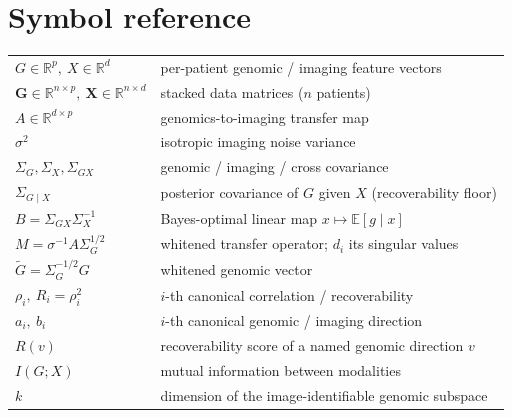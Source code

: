 \documentclass{article}
\newcommand{\R}{\mathbb{R}}
\newcommand{\E}{\mathbb{E}}
\newcommand{\Sg}{\Sigma_{G}}
\newcommand{\Sx}{\Sigma_{X}}
\newcommand{\Sgx}{\Sigma_{GX}}
\newcommand{\Sgcx}{\Sigma_{G\mid X}}
\begin{document}
\appendix
\section{Symbol reference}
\label{app:symbols}

\noindent
\begin{tabular}{ll}
$G \in \R^p,\ X \in \R^d$ & per-patient genomic / imaging feature vectors\\
$\mathbf{G} \in \R^{n\times p},\ \mathbf{X} \in \R^{n\times d}$ & stacked data matrices ($n$ patients)\\
$A \in \R^{d\times p}$ & genomics-to-imaging transfer map\\
$\sigma^2$ & isotropic imaging noise variance\\
$\Sg, \Sx, \Sgx$ & genomic / imaging / cross covariance\\
$\Sgcx$ & posterior covariance of $G$ given $X$ (recoverability floor)\\
$B = \Sgx \Sx^{-1}$ & Bayes-optimal linear map $x \mapsto \E[g\mid x]$\\
$M = \sigma^{-1} A \Sg^{1/2}$ & whitened transfer operator; $d_i$ its singular values\\
$\tilde{G} = \Sg^{-1/2} G$ & whitened genomic vector\\
$\rho_i,\ R_i = \rho_i^2$ & $i$-th canonical correlation / recoverability\\
$a_i,\ b_i$ & $i$-th canonical genomic / imaging direction\\
$R(v)$ & recoverability score of a named genomic direction $v$\\
$I(G;X)$ & mutual information between modalities\\
$k$ & dimension of the image-identifiable genomic subspace\\
\end{tabular}



\end{document}
